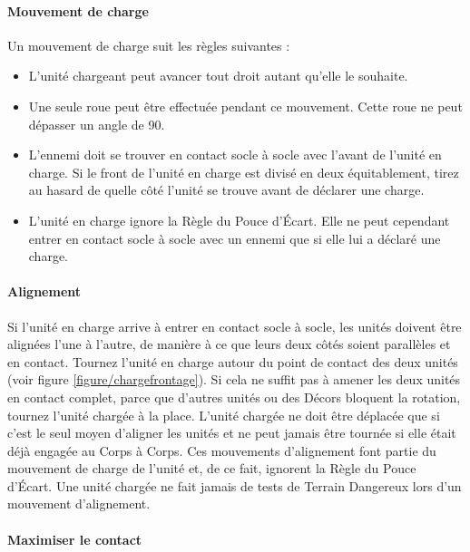 \paragraph{Mouvement de charge}

Un mouvement de charge suit les règles suivantes :
\begin{itemize}[label={-}]
\item L'unité chargeant peut avancer tout droit autant qu'elle le souhaite.
\item Une seule roue peut être effectuée pendant ce mouvement. Cette roue ne peut dépasser un angle de 90{\text{\degree}}.
\item L'ennemi doit se trouver en contact socle à socle avec l'avant de l'unité en charge. Si le front de l'unité en charge est divisé en deux équitablement, tirez au hasard de quelle côté l'unité se trouve avant de déclarer une charge.
\item L'unité en charge ignore la Règle du Pouce d'Écart. Elle ne peut cependant entrer en contact socle à socle avec un ennemi que si elle lui a déclaré une charge.
\end{itemize}

\paragraph{Alignement}

Si l'unité en charge arrive à entrer en contact socle à socle, les unités doivent être alignées l'une à l'autre, de manière à ce que leurs deux côtés soient parallèles et en contact. Tournez l'unité en charge autour du point de contact des deux unités (voir figure \ref{figure/chargefrontage}). Si cela ne suffit pas à amener les deux unités en contact complet, parce que d'autres unités ou des Décors bloquent la rotation, tournez l'unité chargée à la place. L'unité chargée ne doit être déplacée que si c'est le seul moyen d'aligner les unités et ne peut jamais être tournée si elle était déjà engagée au Corps à Corps. Ces mouvements d'alignement font partie du mouvement de charge de l'unité et, de ce fait, ignorent la Règle du Pouce d'Écart. Une unité chargée ne fait jamais de tests de Terrain Dangereux lors d'un mouvement d'alignement.

\paragraph{Maximiser le contact}


